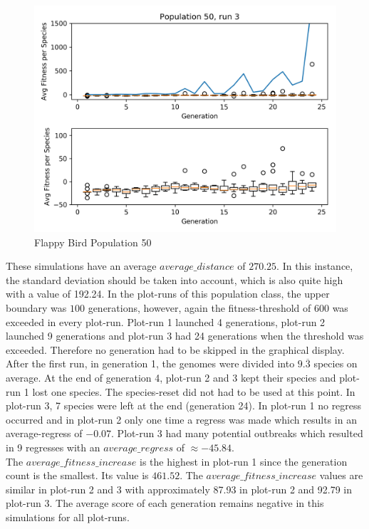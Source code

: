 \begin{figure}[h]
				\begin{minipage}{0.33\textwidth}
					\centering
					\includegraphics[width=1\textwidth]{graphics/flappy/pop50_run3} %
				\end{minipage}
				\caption{Flappy Bird Population 50}
				\label{fig:flappy50}
			\end{figure}
			These simulations have an average $average\_distance$ of $270.25$. In this instance, the standard deviation should be taken into account, which is also quite high with a value of 192.24. 
			In the plot-runs of this population class, the upper boundary was $100$ generations, however, again the fitness-threshold of 600 was exceeded in every plot-run. Plot-run 1 launched 4 generations, plot-run 2 launched 9 generations and plot-run 3 had 24 generations when the threshold was exceeded. Therefore no generation had to be skipped in the graphical display.\\
			After the first run, in generation 1, the genomes were divided into $9.\overline{3}$ species on average. At the end of generation 4, plot-run 2 and 3 kept their species and plot-run 1 lost one species. The species-reset did not had to be used at this point. In plot-run 3, 7 species were left at the end (generation 24).
			In plot-run 1 no regress occurred and in plot-run 2 only one time a regress was made which results in an average-regress of $-0.07$. Plot-run 3 had many potential outbreaks which resulted in 9 regresses with an $average\_regress$ of $\approx-45.84$.\\
			The $average\_fitness\_increase$ is the highest in plot-run 1 since the generation count is the smallest. Its value is $461.52$. The $average\_fitness\_increase$ values are similar in plot-run 2 and 3 with approximately 87.93 in plot-run 2 and 92.79 in plot-run 3. The average score of each generation remains negative in this simulations for all plot-runs.
		
